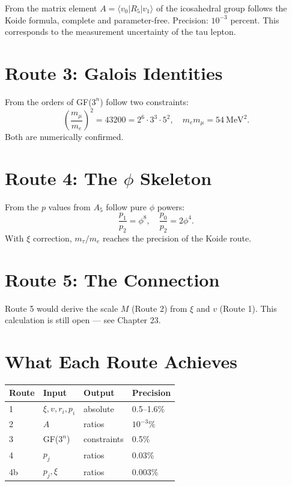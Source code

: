 \documentclass[12pt,oneside]{book}
\begin{document}
From the matrix element $A = \langle v_0 | R_5 | v_1 \rangle$ of the icosahedral group follows the Koide formula, complete and parameter-free. Precision: $10^{-3}$ percent. This corresponds to the measurement uncertainty of the tau lepton.

\section{Route 3: Galois Identities}

From the orders of GF($3^n$) follow two constraints:
\[
\left(\frac{m_\mu}{m_e}\right)^2 = 43200 = 2^6 \cdot 3^3 \cdot 5^2, \quad m_e m_\mu = 54~\text{MeV}^2.
\]
Both are numerically confirmed.

\section{Route 4: The $\phi$ Skeleton}

From the $p$ values from $A_5$ follow pure $\phi$ powers:
\[
\frac{p_1}{p_2} = \phi^8, \quad \frac{p_0}{p_2} = 2\phi^4.
\]
With $\xi$ correction, $m_\tau/m_e$ reaches the precision of the Koide route.

\section{Route 5: The Connection}

Route 5 would derive the scale $M$ (Route 2) from $\xi$ and $v$ (Route 1). This calculation is still open --- see Chapter 23.

\section{What Each Route Achieves}

\begin{center}
\begin{tabular}{llll}
\toprule
Route & Input & Output & Precision \\
\midrule
1 & $\xi, v, r_i, p_i$ & absolute & 0.5--1.6\% \\
2 & $A$ & ratios & $10^{-3}$\% \\
3 & GF($3^n$) & constraints & 0.5\% \\
4 & $p_j$ & ratios & 0.03\% \\
4b & $p_j, \xi$ & ratios & 0.003\% \\
\bottomrule
\end{tabular}
\end{center}
\end{document}
